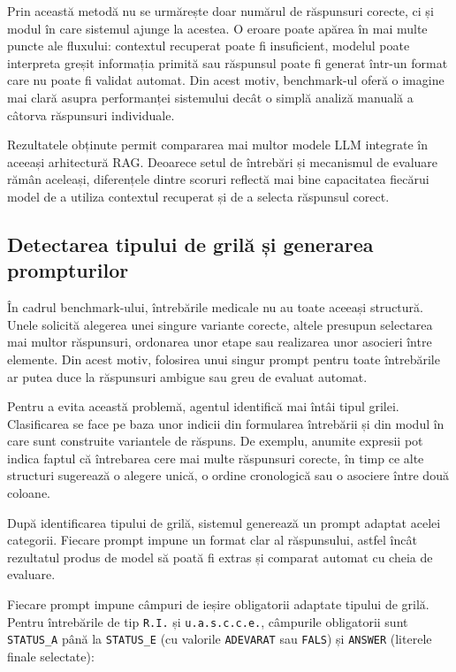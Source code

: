 \documentclass[12pt, a4paper, oneside, romanian]{teza-upb}
\begin{document}
Prin această metodă nu se urmărește doar numărul de răspunsuri corecte, ci și modul în care sistemul ajunge la acestea. O eroare poate apărea în mai multe puncte ale fluxului: contextul recuperat poate fi insuficient, modelul poate interpreta greșit informația primită sau răspunsul poate fi generat într-un format care nu poate fi validat automat. Din acest motiv, benchmark-ul oferă o imagine mai clară asupra performanței sistemului decât o simplă analiză manuală a câtorva răspunsuri individuale.

Rezultatele obținute permit compararea mai multor modele LLM integrate în aceeași arhitectură RAG. Deoarece setul de întrebări și mecanismul de evaluare rămân aceleași, diferențele dintre scoruri reflectă mai bine capacitatea fiecărui model de a utiliza contextul recuperat și de a selecta răspunsul corect.


\subsection{Detectarea tipului de grilă și generarea prompturilor}

În cadrul benchmark-ului, întrebările medicale nu au toate aceeași structură. Unele solicită alegerea unei singure variante corecte, altele presupun selectarea mai multor răspunsuri, ordonarea unor etape sau realizarea unor asocieri între elemente. Din acest motiv, folosirea unui singur prompt pentru toate întrebările ar putea duce la răspunsuri ambigue sau greu de evaluat automat.

Pentru a evita această problemă, agentul identifică mai întâi tipul grilei. Clasificarea se face pe baza unor indicii din formularea întrebării și din modul în care sunt construite variantele de răspuns. De exemplu, anumite expresii pot indica faptul că întrebarea cere mai multe răspunsuri corecte, în timp ce alte structuri sugerează o alegere unică, o ordine cronologică sau o asociere între două coloane.

După identificarea tipului de grilă, sistemul generează un prompt adaptat acelei categorii. Fiecare prompt impune un format clar al răspunsului, astfel încât rezultatul produs de model să poată fi extras și comparat automat cu cheia de evaluare.

Fiecare prompt impune câmpuri de ieșire obligatorii adaptate tipului de grilă. Pentru întrebările de tip \texttt{R.I.} și \texttt{u.a.s.c.c.e.}, câmpurile obligatorii sunt \texttt{STATUS\_A} până la \texttt{STATUS\_E} (cu valorile \texttt{ADEVARAT} sau \texttt{FALS}) și \texttt{ANSWER} (literele finale selectate):
\end{document}
